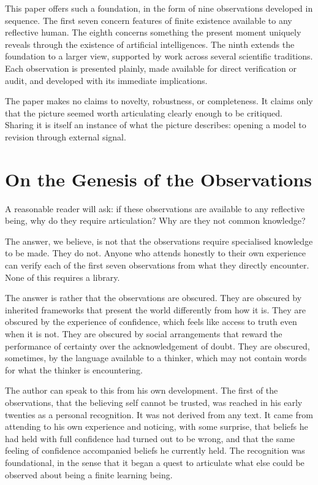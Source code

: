 \documentclass[11pt]{article}
\begin{document}
This paper offers such a foundation, in the form of nine observations 
developed in sequence. The first seven concern features of finite 
existence available to any reflective human. The eighth concerns 
something the present moment uniquely reveals through the existence 
of artificial intelligences. The ninth extends the foundation to a 
larger view, supported by work across several scientific traditions. 
Each observation is presented plainly, made available for direct 
verification or audit, and developed with its immediate implications.

The paper makes no claims to novelty, robustness, or completeness. It 
claims only that the picture seemed worth articulating clearly enough 
to be critiqued. Sharing it is itself an instance of what the picture 
describes: opening a model to revision through external signal.

\section{On the Genesis of the Observations}

A reasonable reader will ask: if these observations are available to 
any reflective being, why do they require articulation? Why are they 
not common knowledge?

The answer, we believe, is not that the observations require 
specialised knowledge to be made. They do not. Anyone who attends 
honestly to their own experience can verify each of the first seven 
observations from what they directly encounter. None of this requires 
a library.

The answer is rather that the observations are obscured. They are 
obscured by inherited frameworks that present the world differently 
from how it is. They are obscured by the experience of confidence, 
which feels like access to truth even when it is not. They are obscured 
by social arrangements that reward the performance of certainty over 
the acknowledgement of doubt. They are obscured, sometimes, by the 
language available to a thinker, which may not contain words for what 
the thinker is encountering.

The author can speak to this from his own development. The first of 
the observations, that the believing self cannot be trusted, was 
reached in his early twenties as a personal recognition. It was not 
derived from any text. It came from attending to his own experience 
and noticing, with some surprise, that beliefs he had held with full 
confidence had turned out to be wrong, and that the same feeling of 
confidence accompanied beliefs he currently held. The recognition was 
foundational, in the sense that it began a quest to articulate what 
else could be observed about being a finite learning being.
\end{document}
